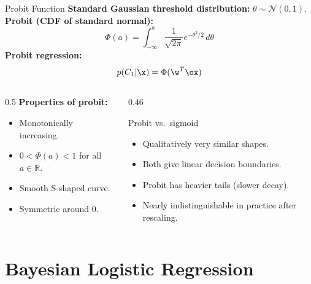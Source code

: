 \begin{frame}{Probit Function}
  \textbf{Standard Gaussian threshold distribution:} $\theta \sim \mathcal{N}(0,1)$.\\[0.3em]
  \textbf{Probit (CDF of standard normal):}
  \[
    \Phi(a) = \int_{-\infty}^a \frac{1}{\sqrt{2\pi}}e^{-\theta^2/2}\,d\theta
  \]
  \textbf{Probit regression:}
  \[
    p(C_1|\x) = \Phi(\w^T\ox)
  \]
  \begin{columns}[T]
    \begin{column}{0.5\textwidth}
      \textbf{Properties of probit:}
      \begin{itemize}
        \item Monotonically increasing.
        \item $0 < \Phi(a) < 1$ for all $a \in \mathbb{R}$.
        \item Smooth S-shaped curve.
        \item Symmetric around 0.
      \end{itemize}
    \end{column}
    \begin{column}{0.46\textwidth}
      \begin{block}{Probit vs.\ sigmoid}
        \begin{itemize}
          \item Qualitatively very similar shapes.
          \item Both give linear decision boundaries.
          \item Probit has heavier tails (slower decay).
          \item Nearly indistinguishable in practice after rescaling.
        \end{itemize}
      \end{block}
    \end{column}
  \end{columns}
\end{frame}

\section{Bayesian Logistic Regression}

